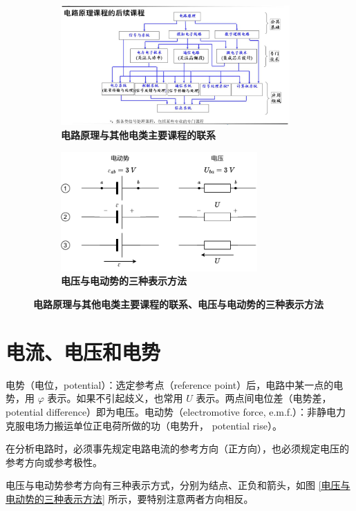 \documentclass[UTF8]{report}
\theoremstyle{MyLineTheoremStyle} %
\theoremstyle{MyBlockTheoremStyle} %
\theoremstyle{MySubsubsectionStyle} %
\begin{document}
\begin{figure}[H]\centering
\begin{subfigure}[t]{0.52\textwidth}\centering
    \includegraphics[height=130pt]{assets/1,2/11b7879b24f71ddbf3e5316424203201.jpg}
    \caption{\bfseries 电路原理与其他电类主要课程的联系 }
\end{subfigure}\begin{subfigure}[t]{0.48\textwidth}\centering
    \includegraphics[height=130pt]{assets/1,2/电动势与电压.drawio.pdf}
    \caption{\bfseries 电压与电动势的三种表示方法 }
\end{subfigure}
\caption{\bfseries 电路原理与其他电类主要课程的联系、电压与电动势的三种表示方法 }\label{电路原理与其他电类主要课程的联系，电压与电动势的三种表示方法}
\end{figure}

\section{电流、电压和电势}

电势（电位，potential）：选定参考点（reference point）后，电路中某一点的电势，用 $\varphi$ 表示。如果不引起歧义，也常用 $U$ 表示。两点间电位差（电势差，potential difference）即为电压。电动势（electromotive force, e.m.f.）：非静电力克服电场力搬运单位正电荷所做的功（电势升， potential rise）。

在分析电路时，必须事先规定电路电流的参考方向（正方向），也必须规定电压的参考方向或参考极性。

电压与电动势参考方向有三种表示方式，分别为结点、正负和箭头，如图 \ref{电压与电动势的三种表示方法} 所示，要特别注意两者方向相反。
\end{document}
